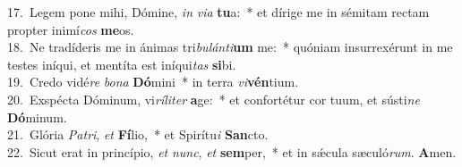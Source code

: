 {17.~}Legem pone mihi, Dómine, \textit{in} \textit{vi}\textit{a} \textbf{tu}a:~* et dírige me in sémitam rectam propter inimí\textit{cos} \textbf{me}os.\\
{18.~}Ne tradíderis me in ánimas tri\textit{bu}\textit{lán}\textit{ti}\textbf{um} me:~* quóniam insurrexérunt in me testes iníqui, et mentíta est iníqui\textit{tas} \textbf{si}bi.\\
{19.~}Credo vidé\textit{re} \textit{bo}\textit{na} \textbf{Dó}mini~* in terra \textit{vi}\textbf{vén}tium.\\
{20.~}Exspécta Dóminum, vi\textit{rí}\textit{li}\textit{ter} \textbf{a}ge:~* et confortétur cor tuum, et sústi\textit{ne} \textbf{Dó}minum.\\
{21.~}Glória \textit{Pa}\textit{tri}, \textit{et} \textbf{Fí}lio,~* et Spirítu\textit{i} \textbf{San}cto.\\
{22.~}Sicut erat in princípio, \textit{et} \textit{nunc}, \textit{et} \textbf{sem}per,~* et in sǽcula sæculó\textit{rum}. \textbf{A}men.\\

